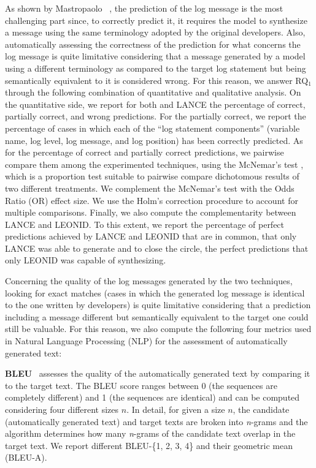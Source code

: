 As shown by Mastropaolo \etal~\cite{mastropaolo2022using}, the prediction of the log message is the most challenging part since, to correctly predict it, it requires the model to synthesize a message using the same terminology adopted by the original developers. Also, automatically assessing the correctness of the prediction for what concerns the log message is quite limitative considering that a message generated by a model using a different terminology as compared to the target log statement but being semantically equivalent to it is considered wrong. For this reason, we answer RQ$_1$ through the following combination of quantitative and qualitative analysis. On the quantitative side, we report for both \approach and LANCE the percentage of correct, partially correct, and wrong predictions. For the partially correct, we report the percentage of cases in which each of the ``log statement components'' (\ie variable name, log level, log message, and log position) has been correctly predicted. As for the percentage of correct and partially correct predictions, we pairwise compare them among the experimented techniques, using the McNemar's test \cite{mcnemar}, which is a proportion test suitable to pairwise compare dichotomous results of two different treatments. We complement the McNemar's test with the Odds Ratio (OR) effect size. We use the Holm's correction procedure \cite{Holm1979a} to account for multiple comparisons. Finally, we also compute the complementarity between LANCE and LEONID. 
To this extent, we report the percentage of perfect predictions achieved by LANCE and LEONID that are in common, that only LANCE was able to generate and to close the circle, the perfect predictions that only LEONID was capable of synthesizing.



Concerning the quality of the log messages generated by the two techniques, looking for exact matches (\ie cases in which the generated log message is identical to the one written by developers) is quite limitative considering that a prediction including a message different but semantically equivalent to the target one could still be valuable. For this reason, we also compute the following four metrics used in Natural Language Processing (NLP) for the assessment of automatically generated text:

\textbf{BLEU}~\cite{papineni2002bleu} assesses the quality of the automatically generated text by comparing it to the target text. The BLEU score ranges between 0 (the sequences are completely different) and 1 (the sequences are identical) and can be computed considering four different sizes $n$. In detail, for given a size $n$, the candidate (\ie automatically generated text) and target texts are broken into \textit{n}-grams and the algorithm determines how many \textit{n}-grams of the candidate text overlap in the target text. We report different  BLEU-\{1, 2, 3, 4\} and their geometric mean (\ie BLEU-A).

